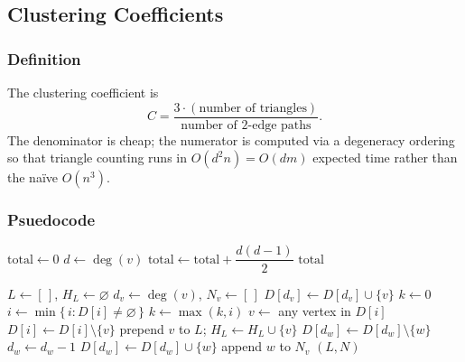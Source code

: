 \subsection{Clustering Coefficients}


\subsubsection{Definition}

The clustering coefficient is
\[
    C = \frac{3 \cdot (\text{number of triangles})}{\text{number of 2-edge paths}}.
\]
The denominator is cheap; the numerator is computed via a degeneracy ordering so that
triangle counting runs in $O(d^2 n) = O(dm)$ expected time rather than the naïve $O(n^3)$.
\subsubsection{Psuedocode}
\begin{algorithm}
    \caption{Number of 2-Edge Paths}\label{alg:paths}
    \begin{algorithmic}[1]
        \State $\text{total} \gets 0$
            \State $d \gets \deg(v)$
            \State $\text{total} \gets \text{total} + \dfrac{d(d-1)}{2}$ 
        \EndFor
        \State \Return $\text{total}$
        \EndProcedure
    \end{algorithmic}
\end{algorithm}

\begin{algorithm}
    \caption{Degeneracy Ordering}\label{alg:degen}
    \begin{algorithmic}[1]
        \State $L \gets [\,]$, \quad $H_L \gets \varnothing$ 
            \State $d_v \gets \deg(v)$, \quad $N_v \gets [\,]$ 
        \EndFor
            \State $D[d_v] \gets D[d_v] \cup \{v\}$ 
        \EndFor
        \State $k \gets 0$
            \State $i \gets \min\{\, i : D[i] \neq \varnothing \,\}$
            \State $k \gets \max(k, i)$
            \State $v \gets$ any vertex in $D[i]$
            \State $D[i] \gets D[i] \setminus \{v\}$
            \State prepend $v$ to $L$; \quad $H_L \gets H_L \cup \{v\}$
                \State $D[d_w] \gets D[d_w] \setminus \{w\}$
                \State $d_w \gets d_w - 1$
                \State $D[d_w] \gets D[d_w] \cup \{w\}$
                \State append $w$ to $N_v$
            \EndFor
        \EndFor
        \State \Return $(L, N)$
        \EndProcedure
    \end{algorithmic}
\end{algorithm}

